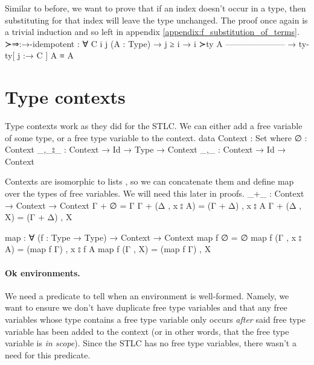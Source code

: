 \documentclass[logo,bsc,singlespacing,parskip,online]{infthesis}
\renewenvironment{code}{\mintedcopy[breaklines,breaksymbolleft=\;]{agda}}{\endmintedcopy}
\begin{document}
Similar to before, we want to prove that if an index doesn't occur in a type, then substituting for
that index will leave the type unchanged. The proof once again is a trivial induction and so left in appendix \ref{appendix:f_substitution_of_terms}.
\begin{code}
  ≻⇒:→-idempotent : ∀ {C i j} (A : Type)
    → j ≥ i       → i ≻ty A
      ---------------------
    → ty-ty[ j :→ C ] A ≡ A
\end{code}

\section{Type contexts}
Type contexts work as they did for the STLC. We can either add a free variable of some type, or a
free type variable to the context.
\begin{code}
  data Context : Set where
    ∅ : Context
    _,_⦂_ : Context → Id → Type → Context
    _,_ : Context → Id → Context
\end{code}

Contexts are isomorphic to lists \citep{wadler_programming_2022}, so we can concatenate them and
define map over the types of free variables. We will need this later in proofs.
\begin{code}
  _+_ : Context → Context → Context
  Γ + ∅ = Γ
  Γ + (Δ , x ⦂ A) = (Γ + Δ) , x ⦂ A
  Γ + (Δ , X) = (Γ + Δ) , X

  map : ∀ (f : Type → Type) → Context → Context
  map f ∅ = ∅
  map f (Γ , x ⦂ A) = (map f Γ) , x ⦂ f A
  map f (Γ , X) = (map f Γ) , X
\end{code}

\paragraph*{Ok environments.} We need a predicate to tell when an environment is well-formed.
Namely, we want to ensure we don't have duplicate free type variables and that any free variables
whose type contains a free type variable only occurs \textit{after} said free type variable has been
added to the context (or in other words, that the free type variable is \textit{in scope}). Since
the STLC has no free type variables, there wasn't a need for this predicate.
\end{document}

